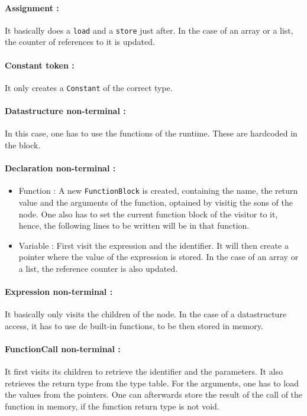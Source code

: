 \documentclass[a4paper,11pt]{article}
\begin{document}
\paragraph{Assignment :} It basically does a \texttt{load} and a \texttt{store} just after. In the case of an array or a list, the counter of references to it is updated.

\paragraph{Constant token :} It only creates a \texttt{Constant} of the correct type.

\paragraph{Datastructure non-terminal :} In this case, one has to use the functions of the runtime. These are hardcoded in the block.

\paragraph{Declaration non-terminal :} 
\begin{itemize}
	\item Function : A new \texttt{FunctionBlock} is created, containing the name, the return value and the arguments of the function, optained by visitig the sons of the node. One also has to set the current function block of the visitor to it, hence, the following lines to be written will be in that function.
	\item Variable : First visit the expression and the identifier. It will then create a pointer where the value of the expression is stored. In the case of an array or a list, the reference counter is also updated.
\end{itemize}

\paragraph{Expression non-terminal :} It basically only visits the children of the node. In the case of a datastructure access, it has to use de built-in functions, to be then stored in memory.

\paragraph{FunctionCall non-terminal :} It first visits its children to retrieve the identifier and the parameters. It also retrieves the return type from the type table. For the arguments, one has to load the values from the pointers. One can afterwards store the result of the call of the function in memory, if the function return type is not void.
\end{document}
